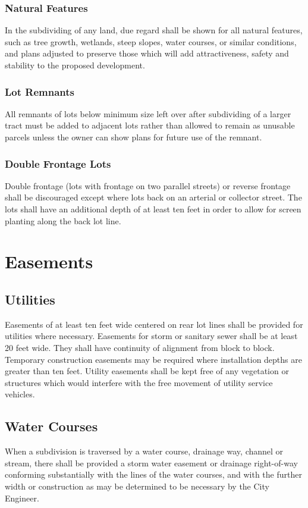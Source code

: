 \subsubsection{Natural Features}
In the subdividing of any land, due regard shall be shown for all natural features, such as tree growth, wetlands, steep slopes, water courses, or similar conditions, and plans adjusted to preserve those which will add attractiveness, safety and stability to the proposed development.
\subsubsection{Lot Remnants}
All remnants of lots below minimum size left over after subdividing of a larger tract must be added to adjacent lots rather than allowed to remain as unusable parcels unless the owner can show plans for future use of the remnant.
\subsubsection{Double Frontage Lots}
Double frontage (lots with frontage on two parallel streets) or reverse frontage shall be discouraged except where lots back on an arterial or collector street.  The lots shall have an additional depth of at least ten feet in order to allow for screen planting along the back lot line.

\section{Easements}
\subsection{Utilities}
Easements of at least ten feet wide centered on rear lot lines shall be provided for utilities where necessary. Easements for storm or sanitary sewer shall be at least 20 feet wide. They shall have continuity of alignment from block to block. Temporary construction easements may be required where installation depths are greater than ten feet. Utility easements shall be kept free of any vegetation or structures which would interfere with the free movement of utility service vehicles.
\subsection{Water Courses}
When a subdivision is traversed by a water course, drainage way, channel or stream, there shall be provided a storm water easement or drainage right-of-way conforming substantially with the lines of the water courses, and with the further width or construction as may be determined to be necessary by the City Engineer.

